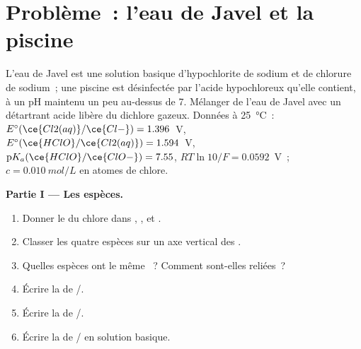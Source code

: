 \section{Problème~: l'eau de Javel et la piscine}

\begin{problem}
\label{pb:b1:e-ph-diagrams:1}
L'eau de Javel est une solution basique d'hypochlorite de sodium et de
chlorure de sodium~; une piscine est désinfectée par l'acide
hypochloreux qu'elle contient, à un pH maintenu un peu au-dessus de 7.
Mélanger de l'eau de Javel avec un détartrant acide libère du dichlore
gazeux. Données à \qty{25}{\celsius}~: $E^\circ(\ce{Cl2(aq)}/\ce{Cl-})
= 1.396$~V, $E^\circ(\ce{HClO}/\ce{Cl2(aq)}) = 1.594$~V,
$\mathrm{p}K_a(\ce{HClO}/\ce{ClO-}) = 7.55$, $RT\ln 10/F = 0.0592$~V~;
 $c = \qty{0.010}{mol/L}$ en atomes de chlore.

\medskip
\noindent\textbf{Partie I --- Les espèces.}
\begin{enumerate}
  \item Donner le  du chlore dans , ,
         et .
  \item Classer les quatre espèces sur un axe vertical des .
  \item Quelles espèces ont le même ~? Comment
        sont-elles reliées~?
  \item Écrire la  de /.
  \item Écrire la  de /.
  \item Écrire la  de / en solution basique.
\end{enumerate}


\end{problem}

